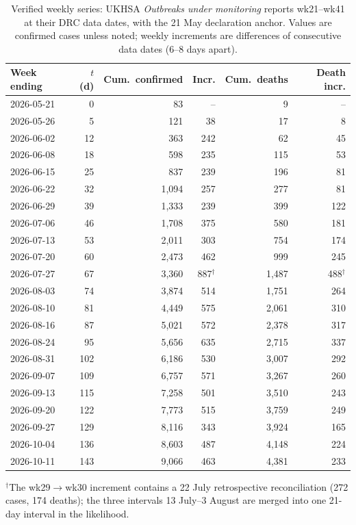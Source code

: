 \documentclass[preprint,12pt,numbers]{elsarticle}
\begin{document}
\begin{table}[htbp]
\centering
\caption{Verified weekly series: UKHSA \emph{Outbreaks under monitoring}
reports wk21--wk41 at their DRC data dates, with the 21 May declaration
anchor. Values are confirmed cases unless noted; weekly increments are
differences of consecutive data dates (6--8 days apart).}
\label{tab:weekly}
\footnotesize
\begin{tabular}{lrrrrr}
\toprule
Week ending & $t$ (d) & Cum.\ confirmed & Incr. & Cum.\ deaths & Death incr. \\
\midrule
2026-05-21 & 0 & 83 & -- & 9 & -- \\
2026-05-26 & 5 & 121 & 38 & 17 & 8 \\
2026-06-02 & 12 & 363 & 242 & 62 & 45 \\
2026-06-08 & 18 & 598 & 235 & 115 & 53 \\
2026-06-15 & 25 & 837 & 239 & 196 & 81 \\
2026-06-22 & 32 & 1{,}094 & 257 & 277 & 81 \\
2026-06-29 & 39 & 1{,}333 & 239 & 399 & 122 \\
2026-07-06 & 46 & 1{,}708 & 375 & 580 & 181 \\
2026-07-13 & 53 & 2{,}011 & 303 & 754 & 174 \\
2026-07-20 & 60 & 2{,}473 & 462 & 999 & 245 \\
2026-07-27 & 67 & 3{,}360 & 887$^\dagger$ & 1{,}487 & 488$^\dagger$ \\
2026-08-03 & 74 & 3{,}874 & 514 & 1{,}751 & 264 \\
2026-08-10 & 81 & 4{,}449 & 575 & 2{,}061 & 310 \\
2026-08-16 & 87 & 5{,}021 & 572 & 2{,}378 & 317 \\
2026-08-24 & 95 & 5{,}656 & 635 & 2{,}715 & 337 \\
2026-08-31 & 102 & 6{,}186 & 530 & 3{,}007 & 292 \\
2026-09-07 & 109 & 6{,}757 & 571 & 3{,}267 & 260 \\
2026-09-13 & 115 & 7{,}258 & 501 & 3{,}510 & 243 \\
2026-09-20 & 122 & 7{,}773 & 515 & 3{,}759 & 249 \\
2026-09-27 & 129 & 8{,}116 & 343 & 3{,}924 & 165 \\
2026-10-04 & 136 & 8{,}603 & 487 & 4{,}148 & 224 \\
2026-10-11 & 143 & 9{,}066 & 463 & 4{,}381 & 233 \\
\bottomrule
\end{tabular}

\vspace{2pt}
\par\footnotesize $^\dagger$The wk29$\to$wk30 increment contains a 22 July
retrospective reconciliation (272 cases, 174 deaths); the three intervals
13 July--3 August are merged into one 21-day interval in the likelihood.
\end{table}
\end{document}
